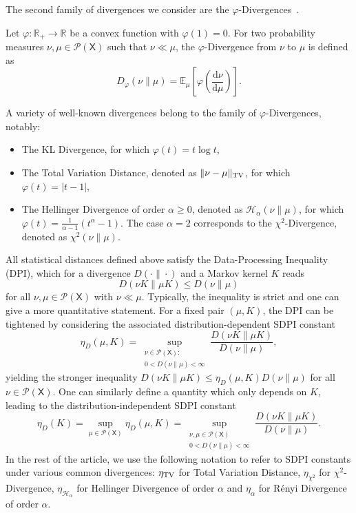 \documentclass[conference,letterpaper]{IEEEtran}
\def \X{\mathsf X}
\def \calP{\mathcal P}
\def \calH{\mathcal H}
\def \reals {\mathbb R}
\newcommand{\dd}[1]{\mathrm{d}#1}
\newcommand{\mean}[2]{\mathbb{E}_{#1}\left[#2\right]}
\begin{document}
The second family of divergences we consider are the $\varphi$-Divergences~\cite{csiszar1967information}.
\begin{definition}
    Let $\varphi:\reals_+\to\reals$ be a convex function with $\varphi(1)=0$. For two probability measures $\nu, \mu \in\calP(\X)$ such that $\nu \ll \mu$, the $\varphi$-Divergence from $\nu$ to $\mu$ is defined as
    \begin{equation*}
        D_\varphi(\nu\|\mu) = \mean{\mu}{\varphi\left(\frac{\dd\nu}{\dd\mu}\right)}.
    \end{equation*}
\end{definition}
A variety of well-known divergences belong to the family of $\varphi$-Divergences, notably:
\begin{itemize}
    \item The KL Divergence, for which $\varphi(t) = t\log t$,
    \item The Total Variation Distance, denoted as $\|\nu-\mu\|_{\rm TV}$, for which $\varphi(t) = |t-1|$,
    \item The Hellinger Divergence of order $\alpha\geq 0$, denoted as $\calH_\alpha(\nu\|\mu)$, for which $\varphi(t) = \frac{1}{\alpha-1}(t^\alpha-1)$. The case $\alpha=2$ corresponds to the $\chi^2$-Divergence, denoted as $\chi^2(\nu\|\mu)$.
\end{itemize}
All statistical distances defined above satisfy the Data-Processing Inequality (DPI), which for a divergence $D(\cdot\|\cdot)$ and a Markov kernel $K$ reads
\begin{equation*}
    D(\nu K\|\mu K) \leq D(\nu\|\mu)
\end{equation*}
for all $\nu, \mu\in\calP(\X)$ with $\nu\ll\mu$. Typically, the inequality is strict and one can give a more quantitative statement. For a fixed pair $(\mu, K)$, the DPI can be tightened by considering the associated distribution-dependent SDPI constant
\begin{equation}\label{eq:dd_sdpi_constant}
    \eta_{D}(\mu, K) = \sup_{\substack{\nu\in\calP(\X): \\0<D(\nu\|\mu)<\infty}} \frac{D(\nu K\|\mu K)}{D(\nu\|\mu)},
\end{equation}
yielding the stronger inequality ${D(\nu K\|\mu K) \leq \eta_{D}(\mu, K)D(\nu\|\mu)}$ for all $\nu\in\calP(\X)$. One can similarly define a quantity which only depends on $K$, leading to the distribution-independent SDPI constant
\begin{equation}\label{eq:di_sdpi_constant}
    \eta_{D}(K) = \sup_{\mu\in\calP(\X)}\eta_D(\mu, K) = \sup_{\substack{\nu, \mu\in\calP(\X)\\0<D(\nu\|\mu)<\infty}} \frac{D(\nu K\|\mu K)}{D(\nu\|\mu)}.
\end{equation}
In the rest of the article, we use the following notation to refer to SDPI constants under various common divergences: $\eta_{\rm TV}$ for Total Variation Distance, $\eta_{\chi^2}$ for $\chi^2$-Divergence, $\eta_{\calH_\alpha}$ for Hellinger Divergence of order $\alpha$ and $\eta_\alpha$ for R\'enyi Divergence of order $\alpha$.
\end{document}
